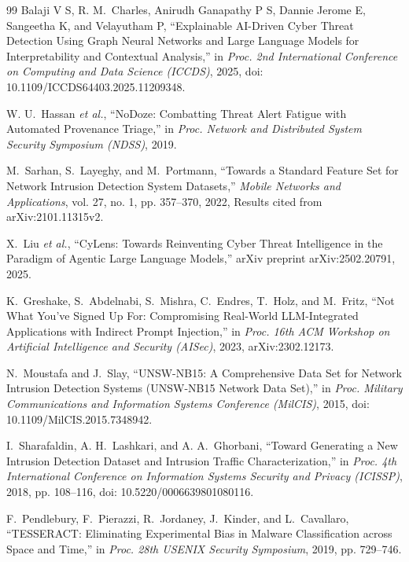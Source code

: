 \documentclass[conference]{IEEEtran}
\begin{document}
\begin{thebibliography}{99}
 Balaji V S, R. M.~Charles, Anirudh Ganapathy P S, Dannie Jerome E, Sangeetha K, and Velayutham P, ``Explainable {AI}-Driven Cyber Threat Detection Using Graph Neural Networks and Large Language Models for Interpretability and Contextual Analysis,'' in \emph{Proc. 2nd International Conference on Computing and Data Science (ICCDS)}, 2025, doi: 10.1109/ICCDS64403.2025.11209348.

 W. U.~Hassan \emph{et al.}, ``{NoDoze}: Combatting Threat Alert Fatigue with Automated Provenance Triage,'' in \emph{Proc. Network and Distributed System Security Symposium (NDSS)}, 2019.

 M.~Sarhan, S.~Layeghy, and M.~Portmann, ``Towards a Standard Feature Set for Network Intrusion Detection System Datasets,'' \emph{Mobile Networks and Applications}, vol. 27, no. 1, pp. 357--370, 2022, Results cited from arXiv:2101.11315v2.

 X.~Liu \emph{et al.}, ``{CyLens}: Towards Reinventing Cyber Threat Intelligence in the Paradigm of Agentic Large Language Models,'' arXiv preprint arXiv:2502.20791, 2025.

 K.~Greshake, S.~Abdelnabi, S.~Mishra, C.~Endres, T.~Holz, and M.~Fritz, ``Not What You've Signed Up For: Compromising Real-World {LLM}-Integrated Applications with Indirect Prompt Injection,'' in \emph{Proc. 16th ACM Workshop on Artificial Intelligence and Security (AISec)}, 2023, arXiv:2302.12173.

 N.~Moustafa and J.~Slay, ``{UNSW-NB15}: A Comprehensive Data Set for Network Intrusion Detection Systems ({UNSW-NB15} Network Data Set),'' in \emph{Proc. Military Communications and Information Systems Conference (MilCIS)}, 2015, doi: 10.1109/MilCIS.2015.7348942.

 I.~Sharafaldin, A. H.~Lashkari, and A. A.~Ghorbani, ``Toward Generating a New Intrusion Detection Dataset and Intrusion Traffic Characterization,'' in \emph{Proc. 4th International Conference on Information Systems Security and Privacy (ICISSP)}, 2018, pp. 108--116, doi: 10.5220/0006639801080116.

 F.~Pendlebury, F.~Pierazzi, R.~Jordaney, J.~Kinder, and L.~Cavallaro, ``{TESSERACT}: Eliminating Experimental Bias in Malware Classification across Space and Time,'' in \emph{Proc. 28th USENIX Security Symposium}, 2019, pp. 729--746.


\end{thebibliography}
\end{document}

